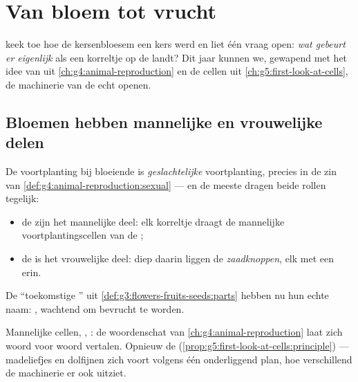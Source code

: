 \chapter{Van bloem tot vrucht}\label{ch:g5:flower-to-fruit}

 keek toe hoe de kersenbloesem een kers
werd en liet één vraag open: \emph{wat gebeurt er eigenlijk} als een
korreltje  op de  landt? Dit jaar kunnen we, gewapend
met het idee van  uit \cref{ch:g4:animal-reproduction} en de
cellen uit \cref{ch:g5:first-look-at-cells}, de machinerie van de 
echt openen.

\section{Bloemen hebben mannelijke en vrouwelijke delen}

\begin{proposition}\label{prop:g5:flower-to-fruit:roles}
De voortplanting bij bloeiende  is \emph{geslachtelijke}
voortplanting, precies in de zin van
\cref{def:g4:animal-reproduction:sexual} --- en de meeste  dragen
beide rollen tegelijk:
\begin{itemize}
  \item de \emph{} zijn het mannelijke deel: elk korreltje
        \emph{} draagt de mannelijke voortplantingscellen van
        de ;
  \item de \emph{} is het vrouwelijke deel: diep daarin liggen de
        \emph{zaadknoppen}, elk met een  erin.
\end{itemize}
De ``toekomstige '' uit
\cref{def:g3:flowers-fruits-seeds:parts} hebben nu hun echte naam:
, wachtend om bevrucht te worden.
\end{proposition}
\admitted

\begin{remark}\label{rem:g5:flower-to-fruit:sameplan}
Mannelijke cellen, , : de woordenschat van
\cref{ch:g4:animal-reproduction} laat zich woord voor woord vertalen.
Opnieuw de 
(\cref{prop:g5:first-look-at-cells:principle}) --- madeliefjes en
dolfijnen  zich voort volgens één onderliggend plan, hoe
verschillend de machinerie er ook uitziet.
\end{remark}

